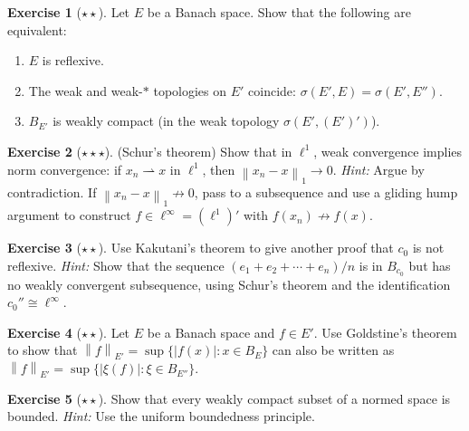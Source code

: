 \documentclass[a4paper,12pt]{book}
\newcommand{\norm}[1]{\left\| #1 \right\|}
\newcommand{\weakto}{\rightharpoonup}
\theoremstyle{definition}
\newtheorem{exercise}{Exercise}[chapter]
\theoremstyle{plain}
\theoremstyle{remark}
\begin{document}
\begin{exercise}[$\star\star$]\label{exo:reflexive-wstar-weak}
Let $E$ be a Banach space.  Show that the following are equivalent:
\begin{enumerate}[label=(\roman*)]
  \item $E$ is reflexive.
  \item The weak and weak-$*$ topologies on $E'$ coincide:
        $\sigma(E',E) = \sigma(E',E'')$.
  \item $B_{E'}$ is weakly compact (in the weak topology $\sigma(E',(E')')$).
\end{enumerate}
\end{exercise}

\begin{exercise}[$\star\star\star$]\label{exo:schur}
(Schur's theorem) Show that in $\ell^1$, weak convergence implies norm
convergence: if $x_n\weakto x$ in $\ell^1$, then $\norm{x_n-x}_1\to 0$.
\textit{Hint:} Argue by contradiction.  If $\norm{x_n-x}_1\not\to 0$, pass
to a subsequence and use a gliding hump argument to construct
$f\in\ell^\infty = (\ell^1)'$ with $f(x_n)\not\to f(x)$.
\end{exercise}

\begin{exercise}[$\star\star$]\label{exo:kakutani-application}
Use Kakutani's theorem to give another proof that $c_0$ is not reflexive.
\textit{Hint:} Show that the sequence $(e_1+e_2+\cdots+e_n)/n$ is in $B_{c_0}$
but has no weakly convergent subsequence, using Schur's theorem and the
identification $c_0''\cong\ell^\infty$.
\end{exercise}

\begin{exercise}[$\star\star$]\label{exo:goldstine-application}
Let $E$ be a Banach space and $f\in E'$.  Use Goldstine's theorem to show
that $\norm{f}_{E'} = \sup\{|f(x)|: x\in B_E\}$ can also be written as
$\norm{f}_{E'} = \sup\{|\xi(f)|: \xi\in B_{E''}\}$.
\end{exercise}

\begin{exercise}[$\star\star$]\label{exo:weak-compact-bounded}
Show that every weakly compact subset of a normed space is bounded.
\textit{Hint:} Use the uniform boundedness principle.
\end{exercise}
\end{document}
